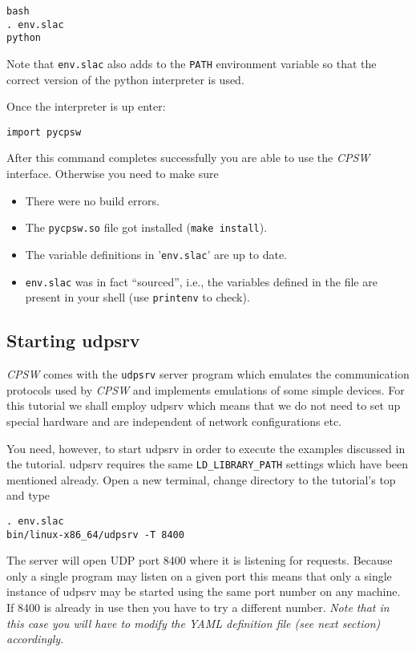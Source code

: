 \documentclass[10pt]{article}
\newcommand{\ita}[1]{\emph{#1}}
\newcommand{\cpsw}      {\ita {CPSW}}
\newcommand{\py}        {python}
\newcommand{\udps}      {udpsrv}
\newcommand{\cod}[1] {{\tt#1}}
\begin{document}
\begin{verbatim}
bash
. env.slac
python
\end{verbatim}

Note that \cod{env.slac} also adds to the \cod{PATH} environment variable so that
the correct version of the \py{} interpreter is used.

Once the interpreter is up enter:

\begin{verbatim}
import pycpsw
\end{verbatim}

After this command completes successfully you are able to use the \cpsw{} interface.
Otherwise you need to make sure
\begin{itemize}
\item There were no build errors.
\item The \cod{pycpsw.so} file got installed (\cod{make install}).
\item The variable definitions in '\cod{env.slac}' are up to date.
\item \cod{env.slac} was in fact ``sourced'', i.e., the variables defined in the
      file are present in your shell (use \cod{printenv} to check).
\end{itemize}

\subsection{Starting \udps}
\cpsw{} comes with the \cod{\udps} server program which emulates the communication
protocols used by \cpsw{} and implements emulations of some simple devices. For this
tutorial we shall employ \udps{} which means that we do not need to set up special
hardware and are independent of network configurations etc.

You need, however, to start \udps{} in order to execute the examples discussed in
the tutorial. \udps{} requires the same \cod{LD\_LIBRARY\_PATH} settings which have
been mentioned already. Open a new terminal, change directory to the tutorial's
top and type
\begin{verbatim}
. env.slac
bin/linux-x86_64/udpsrv -T 8400
\end{verbatim}
The server will open UDP port 8400 where it is listening for requests. Because
only a single program may listen on a given port this means that only a single
instance of \udps{} may be started using the same port number on any machine.
If 8400 is already in use then you have to try a different number. {\em Note
that in this case you will have to modify the YAML definition file
(see next section) accordingly.}
\end{document}

